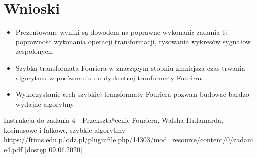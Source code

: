 \documentclass[12pt]{article}
\begin{document}
\section{Wnioski}
\begin {itemize}
\item Prezentowane wyniki są dowodem na poprawne wykonanie zadania tj. poprawność wykonania operacji transformacji, rysowania wykresów sygnałów zespolonych.
\item Szybka transformata Fouriera w znaczącym stopniu zmniejsza czas trwania algorytmu w porównaniu do dyskretnej tranformaty Fouriera
\item Wykorzystanie cech szybkiej transformaty Fouriera pozwala budować bardzo wydajne algorytmy
\end {itemize}


\begin{thebibliography}{0}
 Instrukcja do zadania 4 - Przeksztaªcenie Fouriera, Walsha-Hadamarda, kosinusowe i falkowe, szybkie algorytmy https://ftims.edu.p.lodz.pl/pluginfile.php/14303/mod\_resource/content/0/zadanie4.pdf [dostęp 09.06.2020]

\end{thebibliography}
\end{document}
